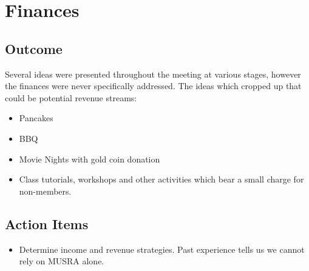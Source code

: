 \section{Finances}
\label{sec:Finances}
\subsection{Outcome}
Several ideas were presented throughout the meeting at various stages, however
the finances were never specifically addressed. The ideas which cropped up that
could be potential revenue streams:
\begin{itemize}
  \item Pancakes
  \item BBQ
  \item Movie Nights with gold coin donation
  \item Class tutorials, workshops and other activities which bear a small
  charge for non-members.
\end{itemize}

\subsection{Action Items}
\begin{itemize}
  \item Determine income and revenue strategies. Past experience tells us we
  cannot rely on MUSRA alone.
\end{itemize}